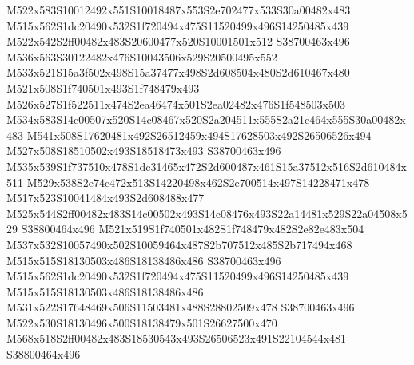 \documentclass{article}
\begin{document}
\begin{multicols}{2}








M522x583S10012492x551S10018487x553S2e702477x533S30a00482x483 M515x562S1dc20490x532S1f720494x475S11520499x496S14250485x439 M522x542S2ff00482x483S20600477x520S10001501x512 S38700463x496 M536x563S30122482x476S10043506x529S20500495x552 M533x521S15a3f502x498S15a37477x498S2d608504x480S2d610467x480 M521x508S1f740501x493S1f748479x493 M526x527S1f522511x474S2ea46474x501S2ea02482x476S1f548503x503 M534x583S14c00507x520S14c08467x520S2a204511x555S2a21c464x555S30a00482x483 M541x508S17620481x492S26512459x494S17628503x492S26506526x494 M527x508S18510502x493S18518473x493 S38700463x496 M535x539S1f737510x478S1dc31465x472S2d600487x461S15a37512x516S2d610484x511 M529x538S2e74c472x513S14220498x462S2e700514x497S14228471x478 M517x523S10041484x493S2d608488x477 M525x544S2ff00482x483S14c00502x493S14c08476x493S22a14481x529S22a04508x529 S38800464x496 M521x519S1f740501x482S1f748479x482S2e82e483x504 M537x532S10057490x502S10059464x487S2b707512x485S2b717494x468 M515x515S18130503x486S18138486x486 S38700463x496 M515x562S1dc20490x532S1f720494x475S11520499x496S14250485x439 M515x515S18130503x486S18138486x486 M531x522S17648469x506S11503481x488S28802509x478 S38700463x496 M522x530S18130496x500S18138479x501S26627500x470 M568x518S2ff00482x483S18530543x493S26506523x491S22104544x481 S38800464x496


\end{multicols}
\end{document}
